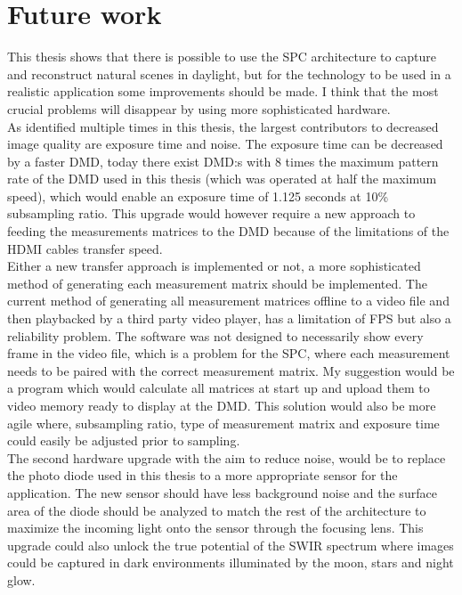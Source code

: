 \section{Future work}
This thesis shows that there is possible to use the SPC architecture to capture and reconstruct natural scenes in daylight, but for the technology to be used in a realistic application some improvements should be made. I think that the most crucial problems will disappear by using more sophisticated hardware.\\[0.1in]

As identified multiple times in this thesis, the largest contributors to decreased image quality are exposure time and noise. The exposure time can be decreased by a faster DMD, today there exist DMD:s with 8 times the maximum pattern rate of the DMD used in this thesis (which was operated at half the maximum speed), which would enable an exposure time of 1.125 seconds at 10\% subsampling ratio. This upgrade would however require a new approach to feeding the measurements matrices to the DMD because of the limitations of the HDMI cables transfer speed.\\[0.1in]

Either a new transfer approach is implemented or not, a more sophisticated method of generating each measurement matrix should be implemented. The current method of generating all  measurement matrices offline to a video file and then playbacked by a third party video player, has a limitation of FPS but also a reliability problem. The software was not designed to necessarily show every frame in the video file, which is a problem for the SPC, where each measurement needs to be paired with the correct measurement matrix. My suggestion would be a program which would calculate all matrices at start up and upload them to video memory ready to display at the DMD. This solution would also be more agile where, subsampling ratio, type of measurement matrix and exposure time could easily be adjusted prior to sampling.\\[0.1in]

The second hardware upgrade with the aim to reduce noise, would be to replace the photo diode used in this thesis to a more appropriate sensor for the application. The new sensor should have less background noise and the surface area of the diode should be analyzed to match the rest of the architecture to maximize the incoming light onto the sensor through the focusing lens. This upgrade could also unlock the true potential of the SWIR spectrum where images could be captured in dark environments illuminated by the moon, stars and night glow.\\[0.1in]

